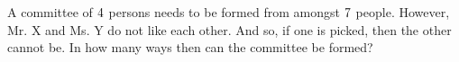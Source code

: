 
%
%
%
%      
% 
% 
%   




\question[2] A committee of $4$ persons needs to be formed from amongst $7$ people. However, 
Mr. X and Ms. Y do not like each other. And so, if one is picked, then the other cannot be. In how many 
ways then can the committee be formed?

